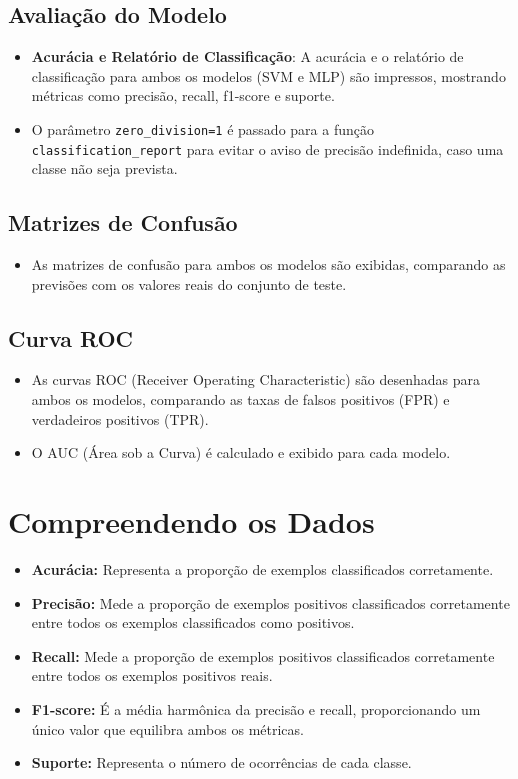 \documentclass[12pt,a4paper,oneside,openany]{article}
\begin{document}
\subsection{Avaliação do Modelo}
\begin{itemize}
    \item \textbf{Acurácia e Relatório de Classificação}: A acurácia e o relatório de classificação para ambos os modelos (SVM e MLP) são impressos, mostrando métricas como precisão, recall, f1-score e suporte.
    \item O parâmetro \texttt{zero\_division=1} é passado para a função \texttt{classification\_report} para evitar o aviso de precisão indefinida, caso uma classe não seja prevista.
\end{itemize}

\subsection{Matrizes de Confusão}
\begin{itemize}
    \item As matrizes de confusão para ambos os modelos são exibidas, comparando as previsões com os valores reais do conjunto de teste.
\end{itemize}

\subsection{Curva ROC}
\begin{itemize}
    \item As curvas ROC (Receiver Operating Characteristic) são desenhadas para ambos os modelos, comparando as taxas de falsos positivos (FPR) e verdadeiros positivos (TPR).
    \item O AUC (Área sob a Curva) é calculado e exibido para cada modelo.   
\end{itemize}

\section{Compreendendo os Dados}
\begin{itemize}
    \item \textbf{Acurácia:} Representa a proporção de exemplos classificados corretamente.
    \item \textbf{Precisão:} Mede a proporção de exemplos positivos classificados corretamente entre todos os exemplos classificados como positivos.
    \item \textbf{Recall:} Mede a proporção de exemplos positivos classificados corretamente entre todos os exemplos positivos reais.
    \item \textbf{F1-score:} É a média harmônica da precisão e recall, proporcionando um único valor que equilibra ambos os métricas.
    \item \textbf{Suporte:} Representa o número de ocorrências de cada classe.
\end{itemize}
\end{document}
